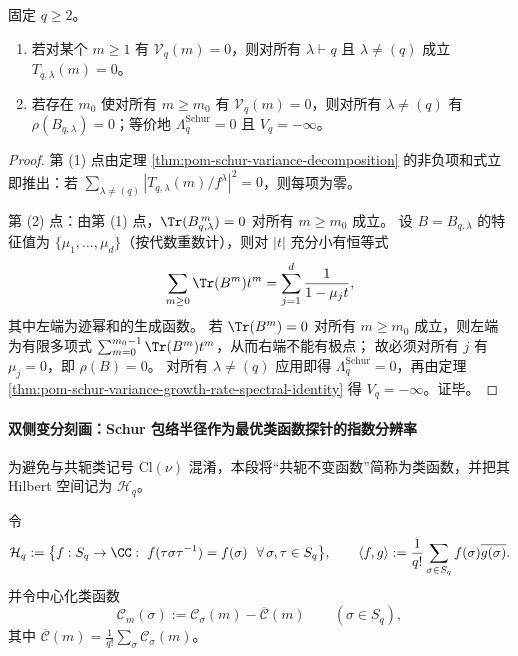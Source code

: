 \begin{proposition}\label{prop:pom-variance-vanishing-implies-nilpotent-channels}
固定 \(q\ge 2\)。
\begin{enumerate}
  \item 若对某个 \(m\ge 1\) 有 \(\mathcal V_q(m)=0\)，则对所有 \(\lambda\vdash q\) 且 \(\lambda\neq(q)\) 成立 \(T_{q,\lambda}(m)=0\)。
  \item 若存在 \(m_0\) 使对所有 \(m\ge m_0\) 有 \(\mathcal V_q(m)=0\)，则对所有 \(\lambda\neq(q)\) 有 \(\rho(B_{q,\lambda})=0\)；等价地 \(\Lambda_q^{\mathrm{Schur}}=0\) 且 \(V_q=-\infty\)。
\end{enumerate}
\end{proposition}
\begin{proof}
第 (1) 点由定理 \ref{thm:pom-schur-variance-decomposition} 的非负项和式立即推出：若 \(\sum_{\lambda\neq(q)}|T_{q,\lambda}(m)/f^\lambda|^2=0\)，则每项为零。
\par
第 (2) 点：由第 (1) 点，\(\Tr(B_{q,\lambda}^{\,m})=0\) 对所有 \(m\ge m_0\) 成立。
设 \(B=B_{q,\lambda}\) 的特征值为 \(\{\mu_1,\dots,\mu_d\}\)（按代数重数计），则对 \(|t|\) 充分小有恒等式
\[
\sum_{m\ge 0}\Tr(B^{m})t^{m}=\sum_{j=1}^{d}\frac{1}{1-\mu_j t},
\]
其中左端为迹幂和的生成函数。
若 \(\Tr(B^{m})=0\) 对所有 \(m\ge m_0\) 成立，则左端为有限多项式 \(\sum_{m=0}^{m_0-1}\Tr(B^{m})t^{m}\)，从而右端不能有极点；
故必须对所有 \(j\) 有 \(\mu_j=0\)，即 \(\rho(B)=0\)。
对所有 \(\lambda\neq(q)\) 应用即得 \(\Lambda_q^{\mathrm{Schur}}=0\)，再由定理 \ref{thm:pom-schur-variance-growth-rate-spectral-identity} 得 \(V_q=-\infty\)。证毕。
\end{proof}

\paragraph{双侧变分刻画：Schur 包络半径作为最优类函数探针的指数分辨率}
为避免与共轭类记号 \(\mathrm{Cl}(\nu)\) 混淆，本段将“共轭不变函数”简称为类函数，并把其 Hilbert 空间记为 \(\mathcal H_q\)。

\begin{definition}[类函数空间与中心化循环型单项式]\label{def:pom-class-functions-centered-cycle-monomials}
令
\[
\mathcal H_q:=\bigl\{f:S_q\to\CC:\ f(\tau\sigma\tau^{-1})=f(\sigma)\ \ \forall\,\sigma,\tau\in S_q\bigr\},
\qquad
\langle f,g\rangle:=\frac{1}{q!}\sum_{\sigma\in S_q}f(\sigma)\overline{g(\sigma)}.
\]
并令中心化类函数
\[
\mathcal C_m(\sigma):=\mathcal C_\sigma(m)-\overline{\mathcal C}(m)\qquad(\sigma\in S_q),
\]
其中 \(\overline{\mathcal C}(m)=\frac{1}{q!}\sum_{\sigma}\mathcal C_\sigma(m)\)。
\end{definition}

